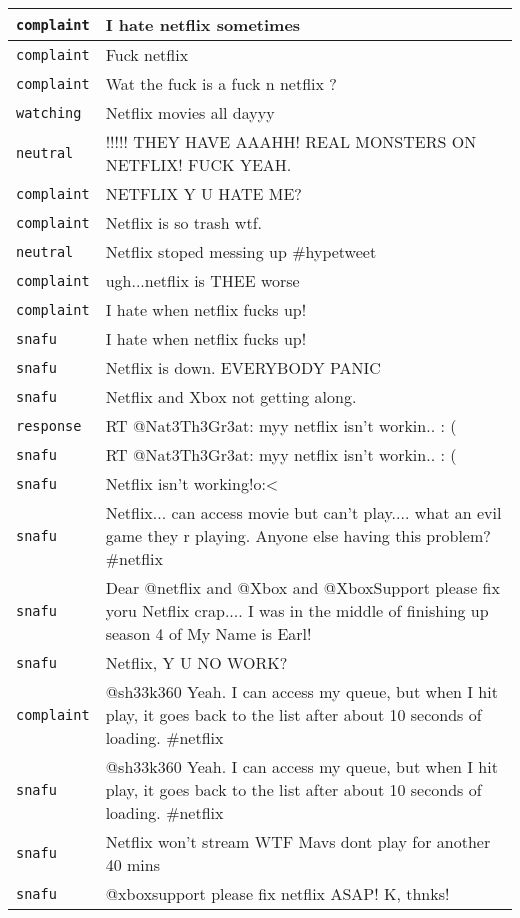 \begin{center}
   \begin{longtable}{|l|p{120mm}|}
      \hline
         \texttt{complaint} & I hate netflix sometimes
      \tabularnewline\hline
         \texttt{complaint} & Fuck netflix
      \tabularnewline\hline
         \texttt{complaint} & Wat the fuck is a fuck n netflix ?
      \tabularnewline\hline
         \texttt{watching} & Netflix movies all dayyy
      \tabularnewline\hline
         \texttt{neutral} & !!!!! THEY HAVE AAAHH! REAL MONSTERS ON NETFLIX! FUCK YEAH.
      \tabularnewline\hline
         \texttt{complaint} & NETFLIX Y U HATE ME?
      \tabularnewline\hline
         \texttt{complaint} & Netflix is so trash wtf.
      \tabularnewline\hline
         \texttt{neutral} & Netflix stoped messing up \#hypetweet
      \tabularnewline\hline
         \texttt{complaint} & ugh...netflix is THEE worse
      \tabularnewline\hline
         \texttt{complaint} & I hate when netflix fucks up!
      \tabularnewline\hline
         \texttt{snafu} & I hate when netflix fucks up!
      \tabularnewline\hline
         \texttt{snafu} & Netflix is down. EVERYBODY PANIC
      \tabularnewline\hline
         \texttt{snafu} & Netflix and Xbox not getting along.
      \tabularnewline\hline
         \texttt{response} & RT @Nat3Th3Gr3at: myy netflix isn't workin.. : (
      \tabularnewline\hline
         \texttt{snafu} & RT @Nat3Th3Gr3at: myy netflix isn't workin.. : (
      \tabularnewline\hline
         \texttt{snafu} & Netflix isn't working!o:<
      \tabularnewline\hline
         \texttt{snafu} & Netflix... can access movie but can't play.... what an evil game they r playing. Anyone else having this problem? \#netflix
      \tabularnewline\hline
         \texttt{snafu} & Dear @netflix and @Xbox and @XboxSupport please fix yoru Netflix crap.... I was in the middle of finishing up season 4 of My Name is Earl!
      \tabularnewline\hline
         \texttt{snafu} & Netflix, Y U NO WORK?
      \tabularnewline\hline
         \texttt{complaint} & @sh33k360 Yeah. I can access my queue, but when I hit play, it goes back to the list after about 10 seconds of loading. \#netflix
      \tabularnewline\hline
         \texttt{snafu} & @sh33k360 Yeah. I can access my queue, but when I hit play, it goes back to the list after about 10 seconds of loading. \#netflix
      \tabularnewline\hline
         \texttt{snafu} & Netflix won't stream WTF Mavs dont play for another 40 mins
      \tabularnewline\hline
         \texttt{snafu} & @xboxsupport please fix netflix ASAP! K, thnks!
      \tabularnewline\hline

\end{longtable}
\end{center}
